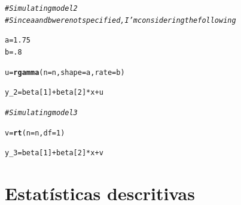 \documentclass{homework}\usepackage[]{graphicx}\usepackage[]{color}
\makeatletter
\newcommand{\hlnum}[1]{\textcolor[rgb]{0.686,0.059,0.569}{#1}}%
\newcommand{\hlcom}[1]{\textcolor[rgb]{0.678,0.584,0.686}{\textit{#1}}}%
\newcommand{\hlopt}[1]{\textcolor[rgb]{0,0,0}{#1}}%
\newcommand{\hlstd}[1]{\textcolor[rgb]{0.345,0.345,0.345}{#1}}%
\newcommand{\hlkwb}[1]{\textcolor[rgb]{0.69,0.353,0.396}{#1}}%
\newcommand{\hlkwc}[1]{\textcolor[rgb]{0.333,0.667,0.333}{#1}}%
\newcommand{\hlkwd}[1]{\textcolor[rgb]{0.737,0.353,0.396}{\textbf{#1}}}%
\newenvironment{kframe}{%
 \def\at@end@of@kframe{}%
 \ifinner\ifhmode%
  \def\at@end@of@kframe{\end{minipage}}%
  \begin{minipage}{\columnwidth}%
 \fi\fi%
 \def\FrameCommand##1{\hskip\@totalleftmargin \hskip-\fboxsep
 \colorbox{shadecolor}{##1}\hskip-\fboxsep
     \hskip-\linewidth \hskip-\@totalleftmargin \hskip\columnwidth}%
 \MakeFramed {\advance\hsize-\width
   \@totalleftmargin\z@ \linewidth\hsize
   \@setminipage}}%
 {\par\unskip\endMakeFramed%
 \at@end@of@kframe}
\newenvironment{knitrout}{}{} %
\makeatother
\begin{document}
\begin{knitrout}
\color{fgcolor}\begin{kframe}
\begin{alltt}
\hlcom{# Simulating model 2}
\hlcom{# Since a and b were not specified, I'm considering the following}

\hlstd{a} \hlkwb{=} \hlnum{1.75}
\hlstd{b} \hlkwb{=} \hlnum{.8}

\hlstd{u} \hlkwb{=} \hlkwd{rgamma}\hlstd{(}\hlkwc{n} \hlstd{= n,} \hlkwc{shape} \hlstd{= a,} \hlkwc{rate} \hlstd{= b)}

\hlstd{y_2} \hlkwb{=} \hlstd{beta[}\hlnum{1}\hlstd{]} \hlopt{+} \hlstd{beta[}\hlnum{2}\hlstd{]} \hlopt{*} \hlstd{x} \hlopt{+} \hlstd{u}
\end{alltt}
\end{kframe}
\end{knitrout}

\begin{knitrout}
\color{fgcolor}\begin{kframe}
\begin{alltt}
\hlcom{# Simulating model 3}

\hlstd{v} \hlkwb{=} \hlkwd{rt}\hlstd{(}\hlkwc{n} \hlstd{= n,} \hlkwc{df} \hlstd{=} \hlnum{1}\hlstd{)}

\hlstd{y_3} \hlkwb{=} \hlstd{beta[}\hlnum{1}\hlstd{]} \hlopt{+} \hlstd{beta[}\hlnum{2}\hlstd{]} \hlopt{*} \hlstd{x} \hlopt{+} \hlstd{v}
\end{alltt}
\end{kframe}
\end{knitrout}

\section{Estatísticas descritivas}
\end{document}
